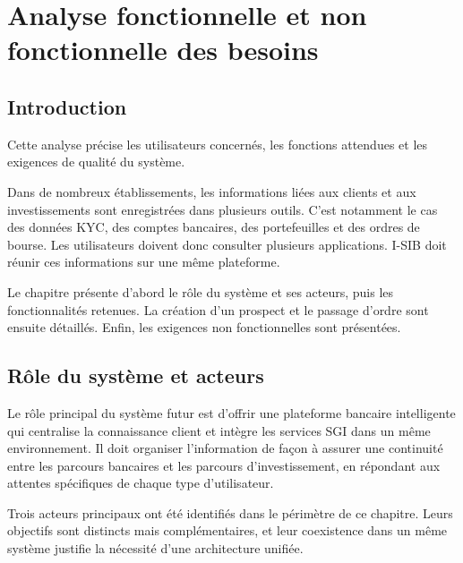 \chapter{Analyse fonctionnelle et non fonctionnelle des besoins}

\section*{Introduction}


Cette analyse précise les utilisateurs concernés, les fonctions attendues et
les exigences de qualité du système.

Dans de nombreux établissements, les informations liées aux clients et aux
investissements sont enregistrées dans plusieurs outils. C'est notamment le cas
des données KYC, des comptes bancaires, des portefeuilles et des ordres de
bourse. Les utilisateurs doivent donc consulter plusieurs applications. I-SIB
doit réunir ces informations sur une même plateforme.

Le chapitre présente d'abord le rôle du système et ses acteurs, puis les
fonctionnalités retenues. La création d'un prospect et le passage d'ordre sont
ensuite détaillés. Enfin, les exigences non fonctionnelles sont présentées.

\section{Rôle du système et acteurs}

Le rôle principal du système futur est d'offrir une plateforme bancaire intelligente qui
centralise la connaissance client et intègre les services SGI dans un même environnement.
Il doit organiser l'information de façon à assurer une continuité entre les parcours
bancaires et les parcours d'investissement, en répondant aux attentes spécifiques de chaque
type d'utilisateur.

Trois acteurs principaux ont été identifiés dans le périmètre de ce chapitre. Leurs
objectifs sont distincts mais complémentaires, et leur coexistence dans un même système
justifie la nécessité d'une architecture unifiée.

